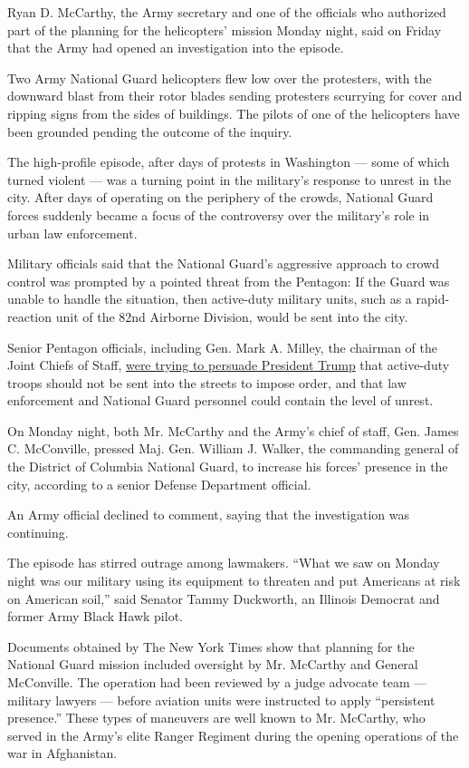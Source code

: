 Ryan D. McCarthy, the Army secretary and one of the officials who
authorized part of the planning for the helicopters' mission Monday
night, said on Friday that the Army had opened an investigation into the
episode.

Two Army National Guard helicopters flew low over the protesters, with
the downward blast from their rotor blades sending protesters scurrying
for cover and ripping signs from the sides of buildings. The pilots of
one of the helicopters have been grounded pending the outcome of the
inquiry.

The high-profile episode, after days of protests in Washington --- some
of which turned violent --- was a turning point in the military's
response to unrest in the city. After days of operating on the periphery
of the crowds, National Guard forces suddenly became a focus of the
controversy over the military's role in urban law enforcement.

Military officials said that the National Guard's aggressive approach to
crowd control was prompted by a pointed threat from the Pentagon: If the
Guard was unable to handle the situation, then active-duty military
units, such as a rapid-reaction unit of the 82nd Airborne Division,
would be sent into the city.

Senior Pentagon officials, including Gen. Mark A. Milley, the chairman
of the Joint Chiefs of Staff,
\href{https://www.nytimes.com/2020/06/05/us/politics/protests-milley-trump.html}{were
trying to persuade President Trump} that active-duty troops should not
be sent into the streets to impose order, and that law enforcement and
National Guard personnel could contain the level of unrest.

On Monday night, both Mr. McCarthy and the Army's chief of staff, Gen.
James C. McConville, pressed Maj. Gen. William J. Walker, the commanding
general of the District of Columbia National Guard, to increase his
forces' presence in the city, according to a senior Defense Department
official.

An Army official declined to comment, saying that the investigation was
continuing.

The episode has stirred outrage among lawmakers. ``What we saw on Monday
night was our military using its equipment to threaten and put Americans
at risk on American soil,'' said Senator Tammy Duckworth, an Illinois
Democrat and former Army Black Hawk pilot.

Documents obtained by The New York Times show that planning for the
National Guard mission included oversight by Mr. McCarthy and General
McConville. The operation had been reviewed by a judge advocate team ---
military lawyers --- before aviation units were instructed to apply
``persistent presence.'' These types of maneuvers are well known to Mr.
McCarthy, who served in the Army's elite Ranger Regiment during the
opening operations of the war in Afghanistan.

